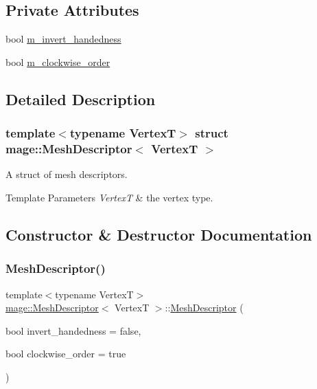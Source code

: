 \subsection*{Private Attributes}
\begin{DoxyCompactItemize}
\item 
bool \hyperlink{structmage_1_1_mesh_descriptor_af7b8124e44ac65ca2088d5d8ca0639f5}{m\+\_\+invert\+\_\+handedness}
\item 
bool \hyperlink{structmage_1_1_mesh_descriptor_a7e769c8d1d81b3514b951b306865dc88}{m\+\_\+clockwise\+\_\+order}
\end{DoxyCompactItemize}


\subsection{Detailed Description}
\subsubsection*{template$<$typename VertexT$>$\newline
struct mage\+::\+Mesh\+Descriptor$<$ Vertex\+T $>$}

A struct of mesh descriptors.


\begin{DoxyTemplParams}{Template Parameters}
{\em VertexT} & the vertex type. \\
\hline
\end{DoxyTemplParams}


\subsection{Constructor \& Destructor Documentation}
\hypertarget{structmage_1_1_mesh_descriptor_ae9c4651675fc0600fca01f0614c70762}{}\label{structmage_1_1_mesh_descriptor_ae9c4651675fc0600fca01f0614c70762} 
\subsubsection{\texorpdfstring{Mesh\+Descriptor()}{MeshDescriptor()}\hspace{0.1cm}{\footnotesize\ttfamily [1/3]}}
{\footnotesize\ttfamily template$<$typename VertexT$>$ \\
\hyperlink{structmage_1_1_mesh_descriptor}{mage\+::\+Mesh\+Descriptor}$<$ VertexT $>$\+::\hyperlink{structmage_1_1_mesh_descriptor}{Mesh\+Descriptor} (\begin{DoxyParamCaption}\item[{bool}]{invert\+\_\+handedness = {\ttfamily false},  }\item[{bool}]{clockwise\+\_\+order = {\ttfamily true} }\end{DoxyParamCaption})\hspace{0.3cm}{\ttfamily [explicit]}}

